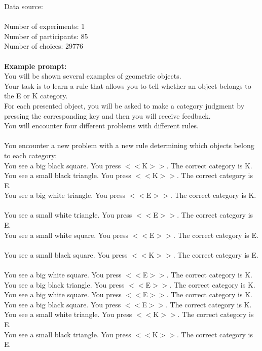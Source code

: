 \documentclass[pdflatex,sn-nature]{sn-jnl}%
\theoremstyle{thmstyleone}%
\theoremstyle{thmstyletwo}%
\theoremstyle{thmstylethree}%
\begin{document}
Data source: \cite{badham2017deficits} \\ $~$ \\
Number of experiments: 1 $~$\\ 
Number of participants: 85 $~$\\ 
Number of choices: 29776 $~$\\ 
 $~$\\ 
\textbf{Example prompt:}
 $~$\\ 
You will be shown several examples of geometric objects. $~$\\ 
Your task is to learn a rule that allows you to tell whether an object belongs to the E or K category. $~$\\ 
For each presented object, you will be asked to make a category judgment by pressing the corresponding key and then you will receive feedback. $~$\\ 
You will encounter four different problems with different rules. $~$\\ 
 $~$\\ 
You encounter a new problem with a new rule determining which objects belong to each category: $~$\\ 
You see a big black square. You press $<<$K$>>$. The correct category is K. $~$\\ 
You see a small black triangle. You press $<<$K$>>$. The correct category is E. $~$\\ 
You see a big white triangle. You press $<<$E$>>$. The correct category is K. $~$\\ 
You see a small white triangle. You press $<<$E$>>$. The correct category is E. $~$\\ 
You see a small white square. You press $<<$E$>>$. The correct category is E. $~$\\ 
You see a small black square. You press $<<$K$>>$. The correct category is E. $~$\\ 
You see a big white square. You press $<<$E$>>$. The correct category is K. $~$\\ 
You see a big black triangle. You press $<<$E$>>$. The correct category is K. $~$\\ 
You see a big white square. You press $<<$E$>>$. The correct category is K. $~$\\ 
You see a big black square. You press $<<$E$>>$. The correct category is K. $~$\\ 
You see a small white triangle. You press $<<$K$>>$. The correct category is E. $~$\\ 
You see a small black triangle. You press $<<$K$>>$. The correct category is E. $~$\\ 
\end{document}
